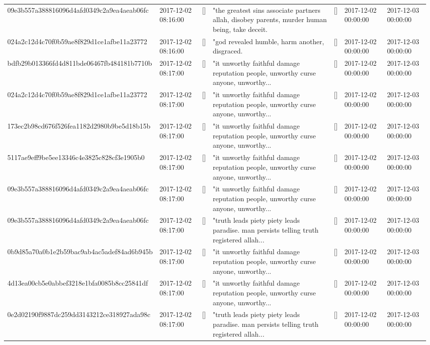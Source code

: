 \begin{tabular}{lllllll}
09e3b557a388816096d4afd0349c2a9ea4aeab06fc & 2017-12-02 08:16:00 & [] & "the greatest sins associate partners allah, disobey parents, murder human being, take deceit. & [] & 2017-12-02 00:00:00 & 2017-12-03 00:00:00 \\
024a2c12d4c70f0b59ae8f829d1ce1afbe11a23772 & 2017-12-02 08:16:00 & [] & "god revealed humble, harm another, disgraced. & [] & 2017-12-02 00:00:00 & 2017-12-03 00:00:00 \\
bdfb29b013366fd4d811bde06467fb484181b7710b & 2017-12-02 08:17:00 & [] & "it unworthy faithful damage reputation people, unworthy curse anyone, unworthy... & [] & 2017-12-02 00:00:00 & 2017-12-03 00:00:00 \\
024a2c12d4c70f0b59ae8f829d1ce1afbe11a23772 & 2017-12-02 08:17:00 & [] & "it unworthy faithful damage reputation people, unworthy curse anyone, unworthy... & [] & 2017-12-02 00:00:00 & 2017-12-03 00:00:00 \\
173ec2b98cd676f526fea1182d2980b9be5d18b15b & 2017-12-02 08:17:00 & [] & "it unworthy faithful damage reputation people, unworthy curse anyone, unworthy... & [] & 2017-12-02 00:00:00 & 2017-12-03 00:00:00 \\
5117ae9eff9be5ee13346c4e3825c828cf3e1905b0 & 2017-12-02 08:17:00 & [] & "it unworthy faithful damage reputation people, unworthy curse anyone, unworthy... & [] & 2017-12-02 00:00:00 & 2017-12-03 00:00:00 \\
09e3b557a388816096d4afd0349c2a9ea4aeab06fc & 2017-12-02 08:17:00 & [] & "it unworthy faithful damage reputation people, unworthy curse anyone, unworthy... & [] & 2017-12-02 00:00:00 & 2017-12-03 00:00:00 \\
09e3b557a388816096d4afd0349c2a9ea4aeab06fc & 2017-12-02 08:17:00 & [] & "truth leads piety piety leads paradise. man persists telling truth registered allah... & [] & 2017-12-02 00:00:00 & 2017-12-03 00:00:00 \\
0b9d85a70a0b1e2b59bac9ab4ac5adef84ad6b945b & 2017-12-02 08:17:00 & [] & "it unworthy faithful damage reputation people, unworthy curse anyone, unworthy... & [] & 2017-12-02 00:00:00 & 2017-12-03 00:00:00 \\
4d13ea00cb5e0abbef3218e1bfa0085b8cc25841df & 2017-12-02 08:17:00 & [] & "it unworthy faithful damage reputation people, unworthy curse anyone, unworthy... & [] & 2017-12-02 00:00:00 & 2017-12-03 00:00:00 \\
0e2d02190f9887dc259dd3143212ce318927ada98c & 2017-12-02 08:17:00 & [] & "truth leads piety piety leads paradise. man persists telling truth registered allah... & [] & 2017-12-02 00:00:00 & 2017-12-03 00:00:00 \\

\end{tabular}
